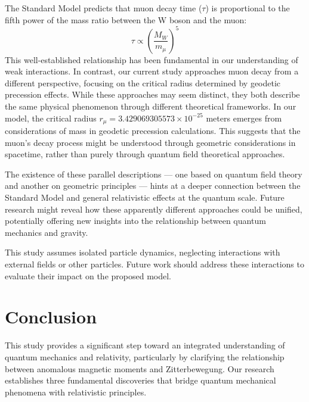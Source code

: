 \documentclass[%
 reprint,
 amsmath,amssymb,
 aps,
]{revtex4-1}
\numberwithin{equation}{section}%
\begin{document}
The Standard Model predicts that muon decay time ($\tau$) is proportional to the fifth power of the mass ratio between the W boson and the muon:
\begin{equation}
\tau \propto \left(\frac{M_W}{m_\mu}\right)^5
\end{equation}
This well-established relationship has been fundamental in our understanding of weak interactions. In contrast, our current study approaches muon decay from a different perspective, focusing on the critical radius determined by geodetic precession effects. While these approaches may seem distinct, they both describe the same physical phenomenon through different theoretical frameworks.
In our model, the critical radius $r_\mu = 3.429069305573 \times 10^{-25}$ meters emerges from considerations of mass in geodetic precession calculations. This suggests that the muon's decay process might be understood through geometric considerations in spacetime, rather than purely through quantum field theoretical approaches.

The existence of these parallel descriptions --- one based on quantum field theory and another on geometric principles --- hints at a deeper connection between the Standard Model and general relativistic effects at the quantum scale. Future research might reveal how these apparently different approaches could be unified, potentially offering new insights into the relationship between quantum mechanics and gravity.

This study assumes isolated particle dynamics, neglecting interactions with external fields or other particles. Future work should address these interactions to evaluate their impact on the proposed model.


\section{Conclusion}
\label{sec:Conclusion}

This study provides a significant step toward an integrated understanding of quantum mechanics and relativity, particularly by clarifying the relationship between anomalous magnetic moments and Zitterbewegung. Our research establishes three fundamental discoveries that bridge quantum mechanical phenomena with relativistic principles.
\end{document}
